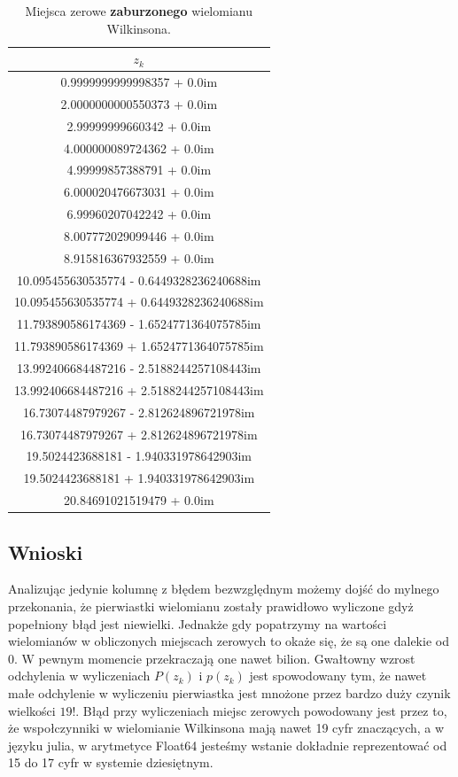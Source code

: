 \documentclass[]{article}
\begin{document}
\begin{table}[h!]
	\centering
	\begin{tabular}{||c||} 
		\hline
		$z_k$\\ [0.5ex] 
		\hline\hline
		0.9999999999998357 + 0.0im \\
		2.0000000000550373 + 0.0im \\
		2.99999999660342 + 0.0im \\
		4.000000089724362 + 0.0im \\
		4.99999857388791 + 0.0im \\
		6.000020476673031 + 0.0im \\
		6.99960207042242 + 0.0im \\
		8.007772029099446 + 0.0im \\
		8.915816367932559 + 0.0im \\
		10.095455630535774 - 0.6449328236240688im \\
		10.095455630535774 + 0.6449328236240688im \\
		11.793890586174369 - 1.6524771364075785im \\
		11.793890586174369 + 1.6524771364075785im \\
		13.992406684487216 - 2.5188244257108443im \\
		13.992406684487216 + 2.5188244257108443im \\
		16.73074487979267 - 2.812624896721978im \\
		16.73074487979267 + 2.812624896721978im \\
		19.5024423688181 - 1.940331978642903im \\
		19.5024423688181 + 1.940331978642903im \\
		20.84691021519479 + 0.0im \\
		\hline
	\end{tabular}
	\caption{Miejsca zerowe \textbf{zaburzonego} wielomianu Wilkinsona.}
\end{table}
\subsection{Wnioski}
Analizując jedynie kolumnę z błędem bezwzględnym możemy dojść do mylnego przekonania, że pierwiastki wielomianu zostały prawidłowo wyliczone gdyż popełniony błąd jest niewielki. Jednakże gdy popatrzymy na wartości wielomianów w obliczonych miejscach zerowych to okaże się, że są one dalekie od $0$. W pewnym momencie przekraczają one nawet bilion. Gwałtowny wzrost odchylenia w wyliczeniach $P(z_k)$ i $p(z_k)$ jest spowodowany tym, że nawet małe odchylenie w wyliczeniu pierwiastka jest mnożone przez bardzo duży czynik wielkości $19!$. Błąd przy wyliczeniach miejsc zerowych powodowany jest przez to, że wspołczynniki w wielomianie Wilkinsona mają nawet 19 cyfr znaczących, a w języku julia, w arytmetyce Float64 jesteśmy wstanie dokładnie reprezentować od 15 do 17 cyfr w systemie dziesiętnym.
\end{document}
